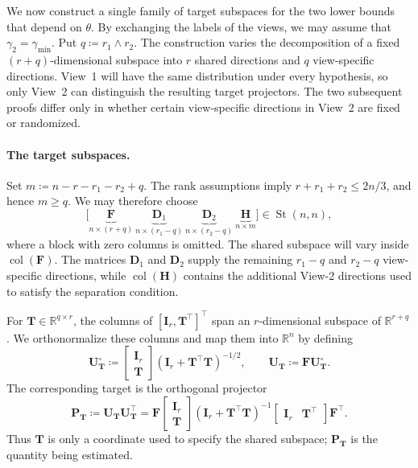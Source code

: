 \documentclass[11pt]{article}
\newcommand{\trans}{\top}
\begin{document}
We now construct a single family of target subspaces for the two lower bounds
that depend on $\theta$.  By exchanging the labels of the views, we may assume
that $\gamma_2=\gamma_{\min}$. 
Put $q\coloneqq r_1\wedge r_2$.  The
construction varies the decomposition of a fixed $(r+q)$-dimensional
subspace into $r$ shared directions and $q$ view-specific directions.  View~1
will have the same distribution under every hypothesis, so only View~2 can
distinguish the resulting target projectors.  The two subsequent proofs differ
only in whether certain view-specific directions in View~2 are fixed or
randomized.


\paragraph{The target subspaces.}
Set $m\coloneqq n-r-r_1-r_2+q$.  The rank assumptions imply
$r+r_1+r_2\le2n/3$, and hence $m\ge q$.  We may therefore choose
\[
  \bigl[
    \underbrace{\bm F}_{n\times(r+q)}
    \ \underbrace{\bm D_1}_{n\times(r_1-q)}
    \ \underbrace{\bm D_2}_{n\times(r_2-q)}
    \ \underbrace{\bm H}_{n\times m}
  \bigr]
  \in\operatorname{St}(n,n),
\]
where a block with zero columns is omitted.  The shared subspace will vary
inside $\operatorname{col}(\bm F)$.  The matrices $\bm D_1$ and $\bm D_2$
supply the remaining $r_1-q$ and $r_2-q$ view-specific directions, while
$\operatorname{col}(\bm H)$ contains the additional View-2 directions used
to satisfy the separation condition.

For $\bm T\in\mathbb R^{q\times r}$, the columns of
$[\bm I_r,\bm T^\trans]^\trans$ span an $r$-dimensional subspace of
$\mathbb R^{r+q}$.  We orthonormalize these columns and map them into
$\mathbb R^n$ by defining
\begin{equation}
\label{eq:lower-shared-basis}
  \bm U_{\bm T}^{\circ}
  \coloneqq
  \begin{bmatrix}
    \bm I_r\\
    \bm T
  \end{bmatrix}
  (\bm I_r+\bm T^\trans\bm T)^{-1/2},
  \qquad
  \bm U_{\bm T}
  \coloneqq
  \bm F\bm U_{\bm T}^{\circ}.
\end{equation}
The corresponding target is the orthogonal projector
\begin{equation}
\label{eq:lower-target-projector}
  \bm P_{\bm T}
  \coloneqq
  \bm U_{\bm T}\bm U_{\bm T}^\trans
  =
  \bm F
  \begin{bmatrix}
    \bm I_r\\
    \bm T
  \end{bmatrix}
  (\bm I_r+\bm T^\trans\bm T)^{-1}
  \begin{bmatrix}
    \bm I_r&\bm T^\trans
  \end{bmatrix}
  \bm F^\trans.
\end{equation}
Thus $\bm T$ is only a coordinate used to specify the shared subspace;
$\bm P_{\bm T}$ is the quantity being estimated.
\end{document}
